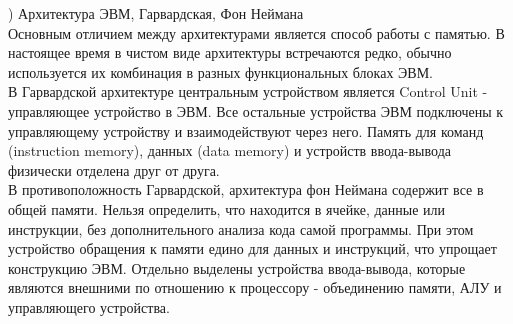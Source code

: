 ) Архитектура ЭВМ, Гарвардская, Фон Неймана \\
Основным отличием между архитектурами является способ работы с памятью. В настоящее время в чистом виде архитектуры встречаются редко, обычно используется их комбинация в разных функциональных блоках ЭВМ. \\
В Гарвардской архитектуре центральным устройством является Control Unit - управляющее устройство в ЭВМ. Все остальные устройства ЭВМ подключены к управляющему устройству и взаимодействуют через него. Память для команд (instruction memory), данных (data memory) и устройств ввода-вывода физически отделена друг от друга. \\
В противоположность Гарвардской, архитектура фон Неймана содержит все в общей памяти. Нельзя определить, что находится в ячейке, данные или инструкции, без дополнительного анализа кода самой программы. При этом устройство обращения к памяти едино для данных и инструкций, что упрощает конструкцию ЭВМ. Отдельно выделены устройства ввода-вывода, которые являются внешними по отношению к процессору - объединению памяти, АЛУ и управляющего устройства. \\

